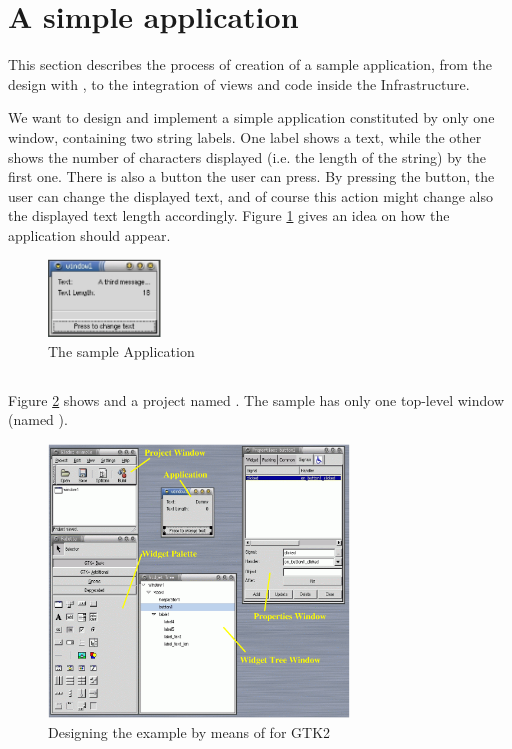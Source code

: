 

\section{\label{SAP} A simple application}
This section describes the process of creation of a sample
application, from the design with \glade, to the integration of views
and code inside the \mvco Infrastructure.

We want to design and implement a simple application constituted by
only one window, containing two string labels. One label shows a text,
while the other shows the number of characters displayed (i.e. the
length of the string) by the first one. There is also a button the
user can press. By pressing the button, the user can change the
displayed text, and of course this action might change also the
displayed text length accordingly. Figure \ref{EX:f} gives an idea on
how the application should appear.

\begin{figure}[htbp]
\begin{center}
\includegraphics[width=3cm]{eps/example.eps}
\caption{\label{EX:f}The sample Application}
\end{center}
\end{figure}

\subsection{\label{GLEX}\glade}
Figure \ref{GL:f} shows \glade and a project named .
The sample \gui has only one top-level window (named
).

\begin{figure}[here]
\begin{center}
\includegraphics[width=8cm]{eps/example_glade.eps}
\caption{\label{GL:f}Designing the example by means of \glade for GTK2}
\end{center}
\end{figure}

